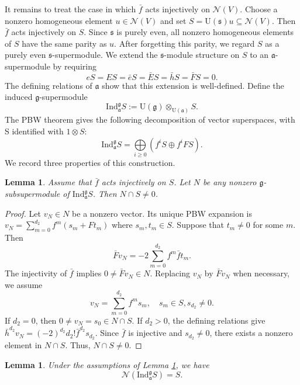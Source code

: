\documentclass[a4paper,10pt]{article}
\theoremstyle{definition}
\theoremstyle{plain}
\newtheorem{lemma}[definition]{Lemma}
\theoremstyle{remark}
\theoremstyle{mystyle}
\numberwithin{equation}{section}
\begin{document}
It remains to treat the case in which \(\bar f\) acts injectively on \(\mathcal N(V)\). Choose a nonzero homogeneous element \(u\in \mathcal N(V)\) and set \(S=\mathrm U(\mathfrak s)u\subseteq \mathcal N(V)\). Then \(\bar f\) acts injectively on \(S\).
Since \(\mathfrak s\) is purely even, all nonzero homogeneous elements of \(S\) have the same parity as \(u\). After forgetting this parity, we regard \(S\) as a purely even \(\mathfrak s\)-supermodule.
We extend the $\mathfrak s$-module structure on $S$ to an $\mathfrak a$-supermodule by requiring
$$
eS=ES=\bar eS=\bar ES=\bar hS=\bar FS=0.
$$
The defining relations of \(\mathfrak a\) show that this extension is well-defined. Define the induced \(\mathfrak g\)-supermodule
$$
   \mathrm{Ind}_{\mathfrak a}^{\mathfrak g}S:=\mathrm U(\mathfrak g)\otimes_{\mathrm U(\mathfrak a)}S.
$$ 
The PBW theorem gives the following decomposition of vector superspaces, with S identified with $1\otimes S$:
$$
\mathrm{Ind}_{\mathfrak a}^{\mathfrak g}S=\bigoplus\limits_{i\geq0}(f^iS\oplus f^iFS).
$$
We record three properties of this construction.
\begin{lemma}\label{nn}
    Assume that $\bar f$ acts injectively on $S$. Let $N$ be any nonzero $\mathfrak g$-subsupermodule of $\mathrm{Ind}_{\mathfrak a}^{\mathfrak g}S$. Then $N\cap S\neq0$.
\end{lemma}
\begin{proof}
    Let $v_N\in N$ be a nonzero vector. Its unique PBW expansion is $v_N=\sum\limits_{m=0}^{d_2}f^m(s_m+Ft_m)$ where $s_m,t_m\in S$. Suppose that $t_m\neq0$ for some $m$. Then 
    $$
        \bar Fv_N=-2\sum_{m=0}^{d_2}f^m\bar ft_m.
    $$
    The injectivity of $\bar f$ implies $0\neq\bar Fv_N\in N$. Replacing $v_N$ by $\bar Fv_N$ when necessary, we assume  
    $$
        v_N=\sum_{m=0}^{d_2}f^ms_m,\quad s_m\in S,s_{d_2}\neq0.
    $$
    If $d_2=0$, then $0\neq v_N=s_0\in N\cap S$. If $d_2>0$, the defining relations give $\bar h^{d_2}v_N=(-2)^{d_2}d_2!\bar f^{d_2}s_{d_2}$. Since $\bar f$ is injective and $s_{d_2}\neq 0$, there exists a nonzero element in $N\cap S$. Thus, $N\cap S\neq 0$.
\end{proof}
\begin{lemma}\label{eeqq}
    Under the assumptions of Lemma \ref{nn}, we have 
    $$
        \mathcal N(\mathrm{Ind}_{\mathfrak a}^{\mathfrak g}S)=S.
    $$
\end{lemma}
\end{document}
